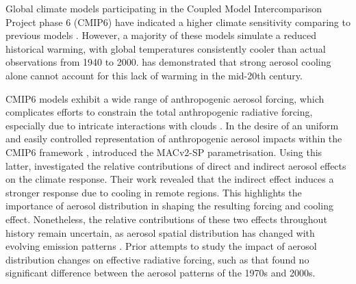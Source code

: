 \documentclass[draft]{agujournal2019}
\begin{document}

      Global climate models participating in the Coupled Model Intercomparison Project phase 6 (CMIP6) have indicated a higher climate sensitivity comparing to previous models \cite{Flynn_2020}. However, a majority of these models simulate a reduced historical warming, with global temperatures consistently cooler than actual observations from 1940 to 2000.  has demonstrated that strong aerosol cooling alone cannot account for this lack of warming in the mid-20th century. 
      
      CMIP6 models exhibit a wide range of anthropogenic aerosol forcing, which complicates efforts to constrain the total anthropogenic radiative forcing, especially due to intricate interactions with clouds \cite{Bellouin_2020}.
      In the desire of an uniform and easily controlled representation of anthropogenic aerosol impacts within the CMIP6 framework \cite{Eyring_2016,Pincus_2016},  introduced the MACv2-SP parametrisation. Using this latter,  investigated the relative contributions of direct and indirect aerosol effects on the climate response. Their work revealed that the indirect effect induces a stronger response due to cooling in remote regions. This highlights the importance of aerosol distribution in shaping the resulting forcing and cooling effect.
      Nonetheless, the relative contributions of these two effects throughout history remain uncertain, as aerosol spatial distribution has changed with evolving emission patterns \cite{Stevens_2015}. Prior attempts to study the impact of aerosol distribution changes on effective radiative forcing, such as  that found no significant difference between the aerosol patterns of the 1970s and 2000s.
\end{document}

